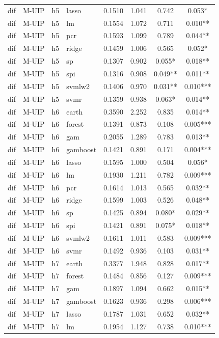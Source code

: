 \begin{ThreePartTable}
\begin{longtable}[t]{llclcccc}
dif & M-UIP & h5 & lasso & 0.1510 & 1.041 & 0.742 & 0.053*\\
dif & M-UIP & h5 & lm & 0.1554 & 1.072 & 0.711 & 0.010**\\
dif & M-UIP & h5 & pcr & 0.1593 & 1.099 & 0.789 & 0.044**\\
dif & M-UIP & h5 & ridge & 0.1459 & 1.006 & 0.565 & 0.052*\\
dif & M-UIP & h5 & sp & 0.1307 & 0.902 & 0.055* & 0.018**\\
dif & M-UIP & h5 & spi & 0.1316 & 0.908 & 0.049** & 0.011**\\
dif & M-UIP & h5 & svmlw2 & 0.1406 & 0.970 & 0.031** & 0.010***\\
dif & M-UIP & h5 & svmr & 0.1359 & 0.938 & 0.063* & 0.014**\\
\addlinespace
dif & M-UIP & h6 & earth & 0.3590 & 2.252 & 0.835 & 0.014**\\
dif & M-UIP & h6 & forest & 0.1391 & 0.873 & 0.108 & 0.005***\\
dif & M-UIP & h6 & gam & 0.2055 & 1.289 & 0.783 & 0.013**\\
dif & M-UIP & h6 & gamboost & 0.1421 & 0.891 & 0.171 & 0.004***\\
dif & M-UIP & h6 & lasso & 0.1595 & 1.000 & 0.504 & 0.056*\\
dif & M-UIP & h6 & lm & 0.1930 & 1.211 & 0.782 & 0.009***\\
dif & M-UIP & h6 & pcr & 0.1614 & 1.013 & 0.565 & 0.032**\\
dif & M-UIP & h6 & ridge & 0.1599 & 1.003 & 0.526 & 0.048**\\
dif & M-UIP & h6 & sp & 0.1425 & 0.894 & 0.080* & 0.029**\\
dif & M-UIP & h6 & spi & 0.1421 & 0.891 & 0.075* & 0.018**\\
dif & M-UIP & h6 & svmlw2 & 0.1611 & 1.011 & 0.583 & 0.009***\\
dif & M-UIP & h6 & svmr & 0.1492 & 0.936 & 0.103 & 0.031**\\
\addlinespace
dif & M-UIP & h7 & earth & 0.3377 & 1.948 & 0.828 & 0.017**\\
dif & M-UIP & h7 & forest & 0.1484 & 0.856 & 0.127 & 0.009***\\
dif & M-UIP & h7 & gam & 0.1897 & 1.094 & 0.662 & 0.015**\\
dif & M-UIP & h7 & gamboost & 0.1623 & 0.936 & 0.298 & 0.006***\\
dif & M-UIP & h7 & lasso & 0.1787 & 1.031 & 0.652 & 0.032**\\
dif & M-UIP & h7 & lm & 0.1954 & 1.127 & 0.738 & 0.010***\\

\end{longtable}
\end{ThreePartTable}
